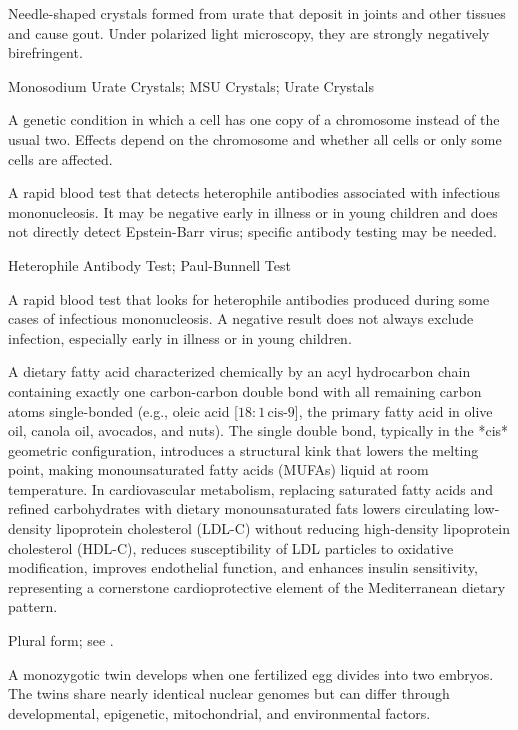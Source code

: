  Needle-shaped crystals formed from urate that deposit in joints and other tissues and cause gout. Under polarized light microscopy, they are strongly negatively birefringent.

\synonyms
Monosodium Urate Crystals; MSU Crystals; Urate Crystals

 A genetic condition in which a cell has one copy of a chromosome instead of the usual two. Effects depend on the chromosome and whether all cells or only some cells are affected.

 A rapid blood test that detects heterophile antibodies associated with infectious mononucleosis. It may be
negative early in illness or in young children and does not directly detect Epstein-Barr
virus; specific antibody testing may be needed.

\synonyms
Heterophile Antibody Test; Paul-Bunnell Test

 A rapid blood test that looks for heterophile antibodies produced during some cases of infectious mononucleosis. A negative result does not always exclude infection, especially early in illness or in young children.

 A dietary fatty acid characterized chemically by an acyl hydrocarbon chain containing exactly one carbon-carbon double bond with all remaining carbon atoms single-bonded (e.g., oleic acid [$18:1\,\text{cis-}9$], the primary fatty acid in olive oil, canola oil, avocados, and nuts). The single double bond, typically in the *cis* geometric configuration, introduces a structural kink that lowers the melting point, making monounsaturated fatty acids (MUFAs) liquid at room temperature. In cardiovascular metabolism, replacing saturated fatty acids and refined carbohydrates with dietary monounsaturated fats lowers circulating low-density lipoprotein cholesterol (LDL-C) without reducing high-density lipoprotein cholesterol (HDL-C), reduces susceptibility of LDL particles to oxidative modification, improves endothelial function, and enhances insulin sensitivity, representing a cornerstone cardioprotective element of the Mediterranean dietary pattern.

 Plural form; see .

 A monozygotic twin develops when one fertilized egg divides into two embryos. The twins share nearly identical nuclear genomes but can differ through developmental, epigenetic, mitochondrial, and environmental factors.


